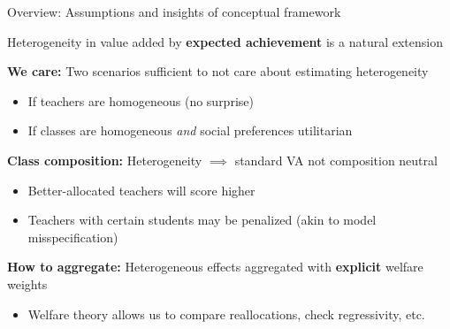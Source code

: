 \documentclass[t,aspectratio=169,11pt]{beamer}
\begin{document}
\begin{frame}{Overview: Assumptions and insights of conceptual framework}


\begin{wideitemize}
    \item Heterogeneity in value added by {\textbf{expected achievement}} is a natural extension
        
    {\tiny \color{gray} \citep{lockwood2009,condie2014teacher,Delgado2020,bates2022teacher}}

    \item<2-> {\textbf{We care:}} Two scenarios sufficient to not care about estimating heterogeneity
      \begin{itemize}
        \item If teachers are homogeneous (no surprise)
        \item If classes are homogeneous \textit{and} social preferences utilitarian

        
    \end{itemize}
    \item<3-> {\textbf{Class composition:}} Heterogeneity $\implies$ standard VA not composition neutral
      \begin{itemize}
        \item Better-allocated teachers will score higher 
        \item Teachers with certain students may be penalized (akin to model misspecification)
                
    \end{itemize}
    
    \item<4-> {\textbf{How to aggregate:}} Heterogeneous effects aggregated with \textbf{explicit} welfare weights
      \begin{itemize}
        \item  Welfare theory allows us to compare reallocations, check regressivity, etc.
        
    \end{itemize} 
\end{wideitemize}


        \hyperlink{ex1}{}
        \hyperlink{ex2}{}   
\end{frame}


\end{document}
